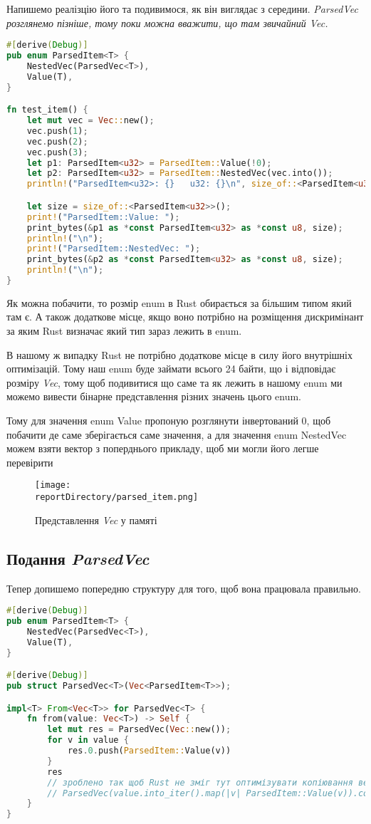Напишемо реалізцію його та подивимося, як він виглядає з середини.
\textit{ParsedVec розглянемо пізніше, тому поки можна вважити, що там звичайний Vec.}
\begin{lstlisting}[language=Rust, style=colouredRust]
#[derive(Debug)]
pub enum ParsedItem<T> {
    NestedVec(ParsedVec<T>),
    Value(T),
}

fn test_item() {
    let mut vec = Vec::new();
    vec.push(1);
    vec.push(2);
    vec.push(3);
    let p1: ParsedItem<u32> = ParsedItem::Value(!0);
    let p2: ParsedItem<u32> = ParsedItem::NestedVec(vec.into());
    println!("ParsedItem<u32>: {}   u32: {}\n", size_of::<ParsedItem<u32>>(), size_of::<u32>());

    let size = size_of::<ParsedItem<u32>>();
    print!("ParsedItem::Value: ");
    print_bytes(&p1 as *const ParsedItem<u32> as *const u8, size);
    println!("\n");
    print!("ParsedItem::NestedVec: ");
    print_bytes(&p2 as *const ParsedItem<u32> as *const u8, size);
    println!("\n");
}
\end{lstlisting}


Як можна побачити, то розмір enum в Rust обирається за більшим типом який там є.
А також додаткове місце, якщо воно потрібно на розміщення дискримінант за яким Rust визначає який тип зараз лежить в enum.

В нашому ж випадку Rust не потрібно додаткове місце в силу його внутрішніх оптимізацій.
Тому наш enum буде займати всього 24 байти, що і відповідає розміру \textit{Vec}, тому щоб подивитися що саме та як лежить в нашому enum ми можемо вивести бінарне представлення різних значень цього enum.

Тому для значення enum Value пропоную розглянути інвертований 0, щоб побачити де саме зберігається саме значення,
а для значення enum NestedVec можем взяти вектор з поперднього прикладу, щоб ми могли його легше перевірити
\begin{figure}[h!]
    \centering
    \texttt{[image: \\reportDirectory/parsed\_item.png]}
    \caption{Представлення \textit{Vec} у памяті}
    \label{fig:task}
\end{figure}


\newpage
\subsection{Подання \textit{ParsedVec}}
Тепер допишемо попередню структуру для того, щоб вона працювала правильно.
\begin{lstlisting}[language=Rust, style=colouredRust]
#[derive(Debug)]
pub enum ParsedItem<T> {
    NestedVec(ParsedVec<T>),
    Value(T),
}

#[derive(Debug)]
pub struct ParsedVec<T>(Vec<ParsedItem<T>>);

impl<T> From<Vec<T>> for ParsedVec<T> {
    fn from(value: Vec<T>) -> Self {
        let mut res = ParsedVec(Vec::new());
        for v in value {
            res.0.push(ParsedItem::Value(v))
        }
        res
        // зроблено так щоб Rust не зміг тут оптимізувати копіювання вектора
        // ParsedVec(value.into_iter().map(|v| ParsedItem::Value(v)).collect())
    }
}
\end{lstlisting}


